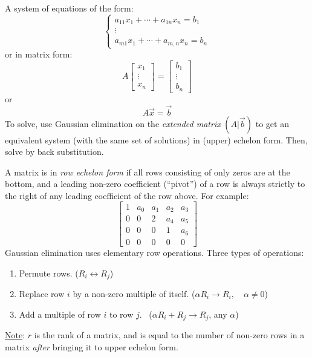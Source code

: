 \documentclass{article}
\newcommand{\comma}{{,}}
\newcommand{\tmem}[1]{{\em #1\/}}
\begin{document}
A system of equations of the form:
\[ \left\{\begin{array}{l}
     a_{11} x_1 + \cdots + a_{1 n} x_n = b_1\\
     \vdots\\
     a_{m 1} x_1 + \cdots + a_{m \comma n} x_n = b_n
   \end{array}\right. \]
or in matrix form:
\[ A \left[\begin{array}{c}
     x_1\\
     \vdots\\
     x_n
   \end{array}\right] = \left[\begin{array}{c}
     b_1\\
     \vdots\\
     b_n
   \end{array}\right] \]
or
\[ A \vec{x} = \vec{b} \]
To solve, use Gaussian elimination on the {\tmem{extended matrix}} $(A|
\vec{b})$ to get an equivalent system (with the same set of solutions) in
(upper) echelon form. Then, solve by back substitution.

A matrix is in {\tmem{row echelon form}} if all rows consisting of only zeros
are at the bottom, and a leading non-zero coefficient (``pivot'') of a row is
always strictly to the right of any leading coefficient of the row above. For
example:
\[ \left[\begin{array}{ccccc}
     1 & a_0 & a_1 & a_2 & a_3\\
     0 & 0 & 2 & a_4 & a_5\\
     0 & 0 & 0 & 1 & a_6\\
     0 & 0 & 0 & 0 & 0
   \end{array}\right] \]
Gaussian elimination uses elementary row operations. Three types of
operations:
\begin{enumerate}
  \item Permute rows. ($R_i \leftrightarrow R_j$)
  
  \item Replace row $i$ by a non-zero multiple of itself. ($\alpha R_i
  \rightarrow R_i, \quad \alpha \neq 0$)
  
  \item Add a multiple of row $i$ to row $j$. \ ($\alpha R_i + R_j \rightarrow
  R_j$, any $\alpha$)
\end{enumerate}
{\underline{Note}}: $r$ is the rank of a matrix, and is equal to the number of
non-zero rows in a matrix {\tmem{after}} bringing it to upper echelon form.
\end{document}
